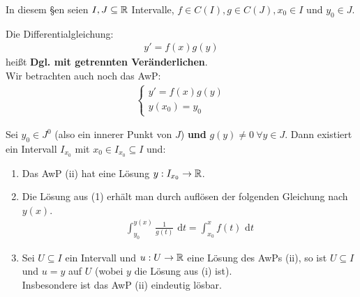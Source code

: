 \documentclass[a4paper,twoside,DIV15,BCOR12mm,chapterprefix=true,headings=twolinechapter]{scrbook}
\begin{document}
In diesem §en seien $I,J\subseteq\mathbb{R}$ Intervalle, $f\in C(I),g\in C(J),x_0\in I$ und
$y_0\in J$.

\begin{definition}
Die Differentialgleichung:
\begin{align*}
y'=f(x)g(y)\tag{i}
\end{align*}
heißt \textbf{Dgl. mit getrennten Veränderlichen}.\\
Wir betrachten auch noch das AwP:
\begin{align*}
\begin{cases}
y'=f(x)g(y)\\
y(x_0)=y_0
\end{cases}
\tag{ii}
\end{align*}
\end{definition}

\begin{satz}
Sei $y_0\in J^0$ (also ein innerer Punkt von $J$) \textbf{und} $g(y)\ne 0\ \forall y\in J$.
Dann existiert ein Intervall $I_{x_0}$ mit $x_0\in I_{x_0}\subseteq I$ und:
\begin{enumerate}
\item Das AwP (ii) hat eine Lösung $y:I_{x_0}\to\mathbb{R}$.
\item Die Lösung aus (1) erhält man durch auflösen der folgenden Gleichung nach $y(x)$.
\begin{align*}
\int_{y_0}^{y(x)}\frac 1{g(t)}\text{ d}t=\int_{x_0}^x f(t)\text{ d}t\tag{$*$}
\end{align*}
\item Sei $U\subseteq I$ ein Intervall und $u:U\to\mathbb{R}$ eine Lösung des AwPs (ii),
so ist $U\subseteq I$ und $u=y$ auf $U$ (wobei $y$ die Lösung aus (i) ist).\\
Insbesondere ist das AwP (ii) eindeutig lösbar.
\end{enumerate}
\end{satz}
\end{document}
